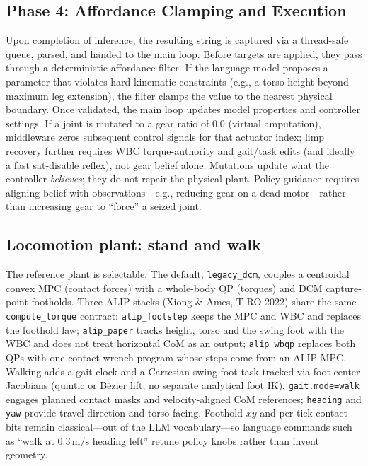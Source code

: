 \subsection{Phase 4: Affordance Clamping and Execution}
\label{sec:apply}

Upon completion of inference, the resulting string is captured via a thread-safe queue, parsed, and handed to the main loop.
Before targets are applied, they pass through a deterministic affordance filter.
If the language model proposes a parameter that violates hard kinematic constraints (e.g., a torso height beyond maximum leg extension), the filter clamps the value to the nearest physical boundary.
Once validated, the main loop updates model properties and controller settings.
If a joint is mutated to a gear ratio of $0.0$ (virtual amputation), middleware zeros subsequent control signals for that actuator index; limp recovery further requires WBC torque-authority and gait/task edits (and ideally a fast sat-disable reflex), not gear belief alone.
Mutations update what the controller \emph{believes}; they do not repair the physical plant.
Policy guidance requires aligning belief with observations---e.g., reducing gear on a dead motor---rather than increasing gear to ``force'' a seized joint.

\subsection{Locomotion plant: stand and walk}
\label{sec:plant}

The reference plant is selectable. The default, \texttt{legacy\_dcm}, couples a centroidal convex MPC (contact forces) with a whole-body QP (torques) and DCM capture-point footholds.
Three ALIP stacks (Xiong \& Ames, T-RO 2022) share the same \texttt{compute\_torque} contract: \texttt{alip\_footstep} keeps the MPC and WBC and replaces the foothold law; \texttt{alip\_paper} tracks height, torso and the swing foot with the WBC and does not treat horizontal CoM as an output; \texttt{alip\_wbqp} replaces both QPs with one contact-wrench program whose steps come from an ALIP MPC.
Walking adds a gait clock and a Cartesian swing-foot task tracked via foot-center Jacobians (quintic or Bézier lift; no separate analytical foot IK).
\texttt{gait.mode=walk} engages planned contact masks and velocity-aligned CoM references; \texttt{heading} and \texttt{yaw} provide travel direction and torso facing.
Foothold $xy$ and per-tick contact bits remain classical---out of the LLM vocabulary---so language commands such as ``walk at $0.3\,\mathrm{m/s}$ heading left'' retune policy knobs rather than invent geometry.

